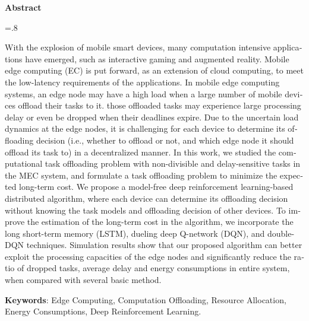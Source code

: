 


\pagestyle{empty}

\begin{latin}

\begin{center}
\textbf{Abstract}
\end{center}
\baselineskip=.8\baselineskip

With the explosion of mobile smart devices, many computation intensive applications have emerged, such as interactive gaming and augmented reality. Mobile edge computing (EC) is put forward, as an extension of cloud computing, to meet the low-latency requirements of the applications. In mobile edge computing systems, an edge node may have a high load when a large number of mobile devices offload their tasks to it. those offloaded tasks may experience large processing delay or even be dropped when their deadlines expire. Due to the uncertain load dynamics at the edge nodes, it is challenging for each device to determine its offloading decision (i.e., whether to offload or not, and which edge node it should offload its task to) in a decentralized manner. In this work, we studied the computational task offloading problem with non-divisible and delay-sensitive tasks in the MEC system, and formulate a task offloading problem to minimize the expected long-term cost. We propose a model-free deep reinforcement learning-based distributed algorithm, where each device can determine its offloading decision without knowing the task models and offloading decision of other devices. To improve the estimation of the long-term cost in the algorithm, we incorporate the long short-term memory (LSTM), dueling deep Q-network (DQN), and double-DQN techniques. Simulation results show that our proposed algorithm can better exploit the processing capacities of the edge nodes and significantly reduce the ratio of dropped tasks, average delay and energy consumptions in entire system, when compared with several basic method.

\bigskip\noindent\textbf{Keywords}:
Edge Computing, Computation Offloading, Resource Allocation, Energy Consumptions, Deep Reinforcement Learning.


\end{latin}

\newpage
